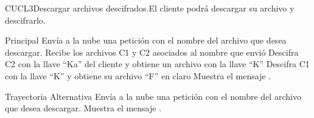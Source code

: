 
\begin{UseCase}{CUCL3}{Descargar archivos descifrados.}{El cliente podrá descargar su archivo y descifrarlo.}

\end{UseCase}


\begin{UCtrayectoria}{Principal}
\UCpaso [\UCactor] Envía a la nube una petición con el nombre del archivo que desea descargar.
\UCpaso Recibe los archivos C1 y C2 asociados al nombre que envió
\UCpaso Descifra C2 con la llave “Ka” del cliente y obtiene un archivo con la llave “K”
\UCpaso Descifra C1 con la llave “K” y obtiene su archivo “F” en claro
\UCpaso Muestra el mensaje .
\end{UCtrayectoria}

\begin{UCtrayectoria}{Trayectoria Alternativa}
\UCpaso [\UCactor] Envía a la nube una petición con el nombre del archivo que desea descargar.
\UCpaso Muestra el mensaje .\end{UCtrayectoria}


